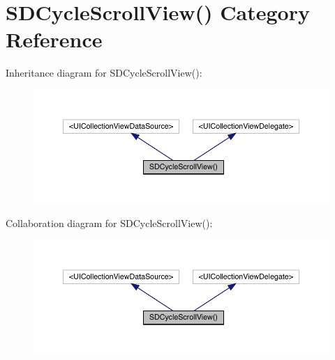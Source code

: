 \hypertarget{category_s_d_cycle_scroll_view_07_08}{}\section{S\+D\+Cycle\+Scroll\+View() Category Reference}
\label{category_s_d_cycle_scroll_view_07_08}


Inheritance diagram for S\+D\+Cycle\+Scroll\+View()\+:\nopagebreak
\begin{figure}[H]
\begin{center}
\leavevmode
\includegraphics[width=350pt]{category_s_d_cycle_scroll_view_07_08__inherit__graph}
\end{center}
\end{figure}


Collaboration diagram for S\+D\+Cycle\+Scroll\+View()\+:\nopagebreak
\begin{figure}[H]
\begin{center}
\leavevmode
\includegraphics[width=350pt]{category_s_d_cycle_scroll_view_07_08__coll__graph}
\end{center}
\end{figure}
